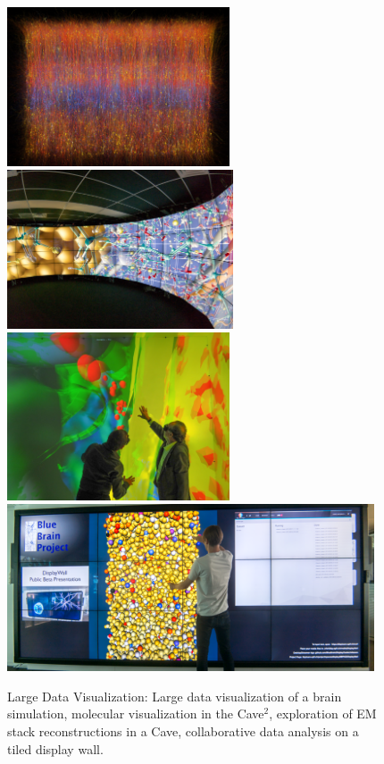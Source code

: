 \begin{figure}[ht]
 \includegraphics[height=4.7cm]{images/slices}\hfil%
 \includegraphics[height=4.7cm]{images/cave2}\\%
 \includegraphics[height=4.95cm]{images/cave}\hfil%
 \includegraphics[height=4.95cm]{images/tide}%
 \caption{\label{FIG_teaser}Large Data Visualization: Large data visualization of a
  brain simulation, molecular visualization in the Cave$^2$, exploration of EM
  stack reconstructions in a Cave, collaborative data analysis on a tiled
  display wall.}
\end{figure}

